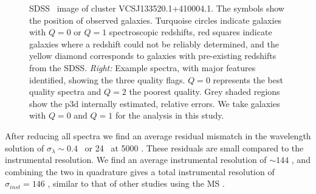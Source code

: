 \begin{figure}[t]
\hfill
{}
    \caption[SDSS \sdssr\ image of cluster VCSJ133520.1+410004.1 and spectra quality examples]{SDSS \sdssr\ image of cluster VCSJ133520.1+410004.1. The symbols show the position of observed galaxies. Turquoise circles indicate galaxies with $Q=0$ or $Q=1$ spectroscopic redshifts, red squares indicate galaxies where a redshift could not be reliably determined, and the yellow diamond corresponds to galaxies with pre-existing redshifts from the SDSS. \textit{Right:} Example spectra, with major features identified, showing the three quality flags. $Q=0$ represents the best quality spectra and $Q=2$ the poorest quality. Grey shaded regions show the {\sc p3d} internally estimated, relative errors. We take galaxies with $Q=0$ and $Q=1$ for the analysis in this study.} 
	\label{2fig:VCSJ133520.1+410004.1}
\end{figure}

After reducing all spectra we find an average residual mismatch in the wavelength solution of $\sigma_\lambda \sim 0.4$ \AAA\ or 24 \kms\ at 5000 \AAA. These residuals are small compared to the instrumental resolution. We find an average instrumental resolution of $\sim144$ \kms, and combining the two in quadrature gives a total instrumental resolution of $\sigma_{inst} = 146$ \kms, similar to that of other studies using the MS .

